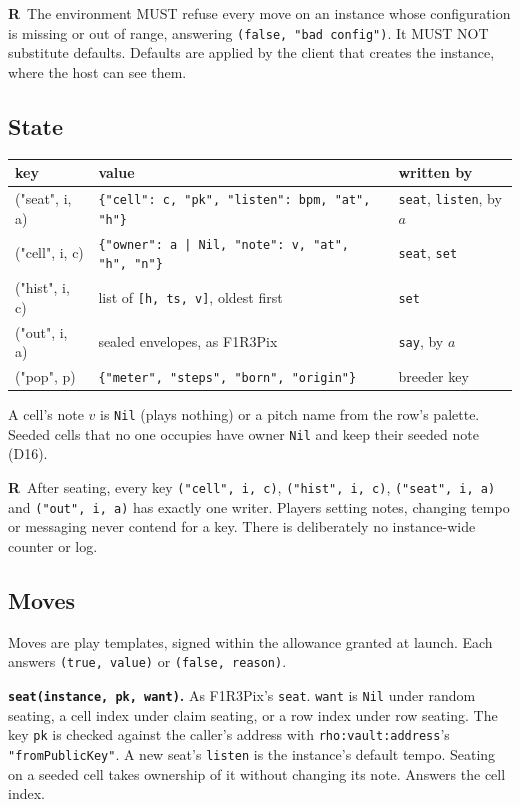 \documentclass[11pt,a4paper]{article}
\newcommand{\code}[1]{\texttt{#1}}
\newcommand{\MUST}{\textsc{must}}
\newcommand{\MUSTNOT}{\textsc{must not}}
\newcounter{req}
\newcommand{\req}[1]{\refstepcounter{req}\label{#1}\textbf{R\thereq}}
\renewcommand{\MUST}{{\fontsize{0.82em}{1em}\selectfont MUST}}
\renewcommand{\MUSTNOT}{{\fontsize{0.82em}{1em}\selectfont MUST NOT}}
\begin{document}
\req{r:config}~The environment \MUST{} refuse every move on an instance whose configuration is
missing or out of range, answering \code{(false, "bad config")}. It \MUSTNOT{} substitute
defaults. Defaults are applied by the client that creates the instance, where the host can see
them.

\subsection{State}

\begin{center}\small
\begin{tabularx}{\linewidth}{@{}>{\ttfamily}p{27mm} X >{\raggedright\arraybackslash}p{24mm}@{}}
\toprule
\normalfont key & value & written by\\
\midrule
("seat", i, a)  & \code{\{"cell": c, "pk", "listen": bpm, "at", "h"\}} & \code{seat}, \code{listen}, by $a$\\
("cell", i, c)  & \code{\{"owner": a | Nil, "note": v, "at", "h", "n"\}} & \code{seat}, \code{set}\\
("hist", i, c)  & list of \code{[h, ts, v]}, oldest first & \code{set}\\
("out", i, a)   & sealed envelopes, as F1R3Pix & \code{say}, by $a$\\
("pop", p)      & \code{\{"meter", "steps", "born", "origin"\}} & breeder key\\
\bottomrule
\end{tabularx}
\end{center}

A cell's note $v$ is \code{Nil} (plays nothing) or a pitch name from the row's palette. Seeded cells that no one occupies have
owner \code{Nil} and keep their seeded note (D16).

\req{r:single-writer}~After seating, every key \code{("cell", i, c)}, \code{("hist", i, c)},
\code{("seat", i, a)} and \code{("out", i, a)} has exactly one writer. Players setting notes,
changing tempo or messaging never contend for a key. There is deliberately no instance-wide
counter or log.

\subsection{Moves}

Moves are play templates, signed within the allowance granted at launch. Each answers
\code{(true, value)} or \code{(false, reason)}.

\textbf{\code{seat(instance, pk, want)}.} As F1R3Pix's \code{seat}. \code{want} is \code{Nil}
under random seating, a cell index under claim seating, or a row index under row seating. The
key \code{pk} is checked against the caller's address with \code{rho:vault:address}'s
\code{"fromPublicKey"}. A new seat's \code{listen} is the instance's default tempo. Seating on a
seeded cell takes ownership of it without changing its note. Answers the cell index.
\end{document}

